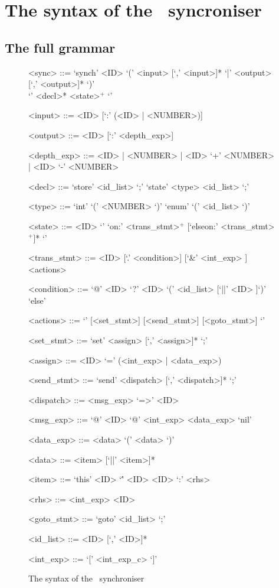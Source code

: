 \chapter{The syntax of the \ak\ syncroniser}

  \section{The full grammar\label{sync_syntax}}
\setlength{\grammarindent}{8em} %
\begin{figure}[h!]
\scriptsize
\begin{grammar}
<sync> ::= `synch' <ID> `(' <input> [`,' <input>]* `|' <output> [`,' <output>]* `)' \\
           `{' <decl>* <state>$^+$ `}'

<input>  ::= <ID> [`:' (<ID> | <NUMBER>)]

<output>  ::= <ID> [`:' <depth\_exp>]

<depth\_exp> ::= <ID> | <NUMBER> | <ID> `+' <NUMBER> | <ID> `-' <NUMBER>

<decl> ::= `store' <id\_list> `;'
        \alt `state' <type> <id\_list> `;'

<type> ::= `int' `(' <NUMBER> `)'
                  \alt `enum' `(' <id\_list> `)'

<state> ::= <ID> `{' `on:' <trans\_stmt>$^+$ [`elseon:' <trans\_stmt>$^+$]* `}'

<trans\_stmt> ::= <ID> [`.' <condition>] [`&' <int\_exp> ] <actions>

<condition> ::= `@' <ID>
             \alt `?' <ID>
             \alt [`?' <ID>] `(' <id\_list> [`||' <ID> ]`)'
             \alt `else'

<actions> ::= `{' [<set\_stmt>] [<send\_stmt>] [<goto\_stmt>] `}'

<set\_stmt> ::= `set' <assign> [`,' <assign>]* `;'

<assign> ::= <ID> `=' (<int\_exp> | <data\_exp>)

<send\_stmt> ::= `send' <dispatch> [`,' <dispatch>]*  `;'

<dispatch> ::= <msg\_exp> `=>' <ID>

<msg\_exp> ::= `@' <ID>
           \alt `@' <int\_exp>
           \alt [`?' <ID>] <data\_exp>
           \alt `nil'

<data\_exp> ::= <data>
             \alt `(' <data> `)'

<data> ::= <item> [`||' <item>]*

<item> ::= `this'
        \alt <ID>
        \alt `\'' <ID>
        \alt <ID> `:' <rhs>

<rhs> ::= <int\_exp>
          \alt <ID>

<goto\_stmt> ::= `goto' <id\_list> `;'

<id\_list> ::= <ID> [`,' <ID>]*

<int\_exp> ::= `[' <int\_exp\_c> `]'
\end{grammar}
\caption{The syntax of the \ak\ synchroniser}
\end{figure}


